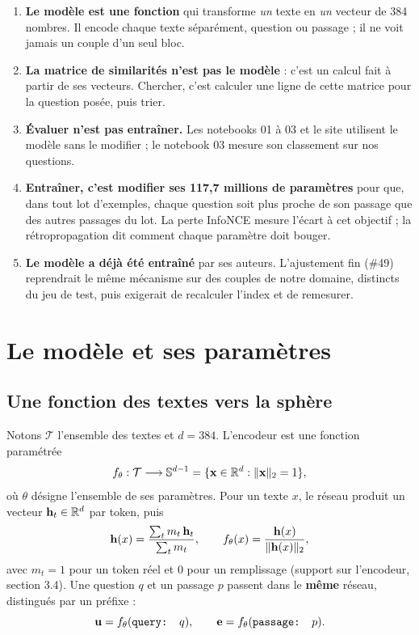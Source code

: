 \begin{enumerate}
\item \textbf{Le modèle est une fonction} qui transforme \emph{un} texte en \emph{un} vecteur de 384 nombres. Il
  encode chaque texte séparément, question ou passage ; il ne voit jamais un couple d'un seul bloc.
\item \textbf{La matrice de similarités n'est pas le modèle} : c'est un calcul fait à partir de ses vecteurs. Chercher,
  c'est calculer une ligne de cette matrice pour la question posée, puis trier.
\item \textbf{Évaluer n'est pas entraîner.} Les notebooks 01 à 03 et le site utilisent le modèle sans le modifier ; le
  notebook 03 mesure son classement sur nos questions.
\item \textbf{Entraîner, c'est modifier ses 117,7 millions de paramètres} pour que, dans tout lot d'exemples, chaque
  question soit plus proche de son passage que des autres passages du lot. La perte InfoNCE mesure l'écart à cet
  objectif ; la rétropropagation dit comment chaque paramètre doit bouger.
\item \textbf{Le modèle a déjà été entraîné} par ses auteurs. L'ajustement fin (\#49) reprendrait le même mécanisme
  sur des couples de notre domaine, distincts du jeu de test, puis exigerait de recalculer l'index et de remesurer.
\end{enumerate}

\section{Le modèle et ses paramètres}

\subsection{Une fonction des textes vers la sphère}

Notons $\mathcal{T}$ l'ensemble des textes et $d = 384$. L'encodeur est une fonction paramétrée
\[
  f_\theta : \mathcal{T} \longrightarrow \mathbb{S}^{d-1} = \{\mathbf{x} \in \mathbb{R}^d : \lVert\mathbf{x}\rVert_2 = 1\},
\]
où $\theta$ désigne l'ensemble de ses paramètres. Pour un texte $x$, le réseau produit un vecteur
$\mathbf{h}_t \in \mathbb{R}^d$ par token, puis
\[
  \mathbf{h}(x) = \frac{\sum_t m_t\,\mathbf{h}_t}{\sum_t m_t},
  \qquad
  f_\theta(x) = \frac{\mathbf{h}(x)}{\lVert\mathbf{h}(x)\rVert_2},
\]
avec $m_t = 1$ pour un token réel et $0$ pour un remplissage (support sur l'encodeur, section 3.4). Une question
$q$ et un passage $p$ passent dans le \textbf{même} réseau, distingués par un préfixe \source :
\[
  \mathbf{u} = f_\theta(\text{{\ttfamily query: }} q), \qquad \mathbf{e} = f_\theta(\text{{\ttfamily passage: }} p).
\]

